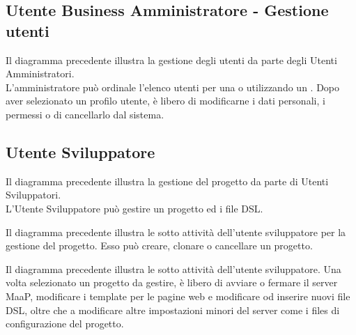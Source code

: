 \subsection{Utente Business Amministratore - Gestione utenti}
Il diagramma precedente illustra la gestione degli utenti da parte degli Utenti Amministratori.\\
L'amministratore può ordinale l'elenco utenti per una  o utilizzando un . Dopo aver selezionato un profilo utente, è libero di modificarne i dati personali, i permessi o di cancellarlo dal sistema.

\subsection{Utente Sviluppatore}
Il diagramma precedente illustra la gestione del progetto da parte di Utenti Sviluppatori.\\
L'Utente Sviluppatore può gestire un progetto ed i file DSL.

Il diagramma precedente illustra le sotto attività dell'utente sviluppatore per la gestione del progetto. Esso può  creare, clonare o cancellare un progetto.

Il diagramma precedente illustra le sotto attività dell'utente sviluppatore. Una volta selezionato un progetto da gestire, è libero di avviare o fermare il server MaaP, modificare i template per le pagine web e modificare od inserire nuovi file DSL, oltre che a modificare altre impostazioni minori del server come i files di configurazione del progetto.

